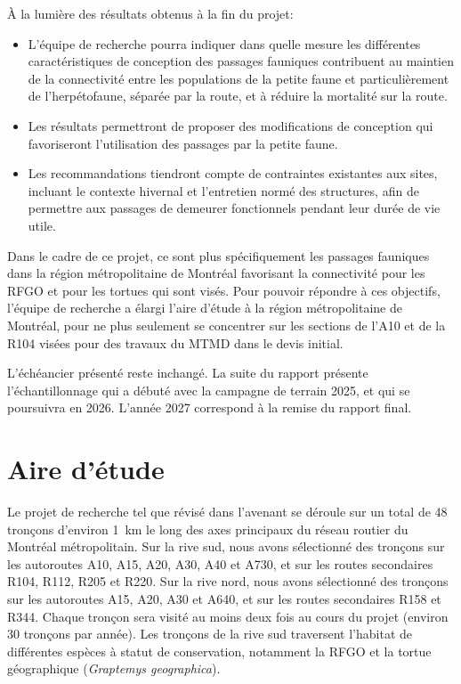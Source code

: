 À la lumière des résultats obtenus à la fin du projet:

\begin{itemize}
  \item L'équipe de recherche pourra indiquer dans quelle mesure les différentes
        caractéristiques de conception des passages fauniques contribuent au
        maintien de la connectivité entre les populations de la petite faune et
        particulièrement de l'herpétofaune, séparée par la route, et à réduire la
        mortalité sur la route.
  \item Les résultats permettront de proposer des modifications de conception qui
        favoriseront l'utilisation des passages par la petite faune.
  \item Les recommandations tiendront compte de contraintes existantes aux sites,
        incluant le contexte hivernal et l'entretien normé des structures, afin de
        permettre aux passages de demeurer fonctionnels pendant leur durée de vie
        utile.
\end{itemize}

Dans le cadre de ce projet, ce sont plus spécifiquement les passages fauniques dans
la région métropolitaine de Montréal favorisant la connectivité pour les RFGO et
pour les tortues qui sont visés. Pour pouvoir répondre à ces objectifs, l'équipe de
recherche a élargi l'aire d'étude à la région métropolitaine de Montréal, pour ne
plus seulement se concentrer sur les sections de l'A10 et de la R104 visées pour des
travaux du MTMD dans le devis initial.

L'échéancier présenté reste inchangé. La suite du rapport présente l'échantillonnage
qui a débuté avec la campagne de terrain 2025, et qui se poursuivra en 2026.
L'année 2027 correspond à la remise du rapport final.

\section{Aire d'étude}

Le projet de recherche tel que révisé dans l'avenant se déroule sur un total de 48
tronçons d'environ 1~km le long des axes principaux du réseau routier du Montréal
métropolitain. Sur la rive sud, nous avons sélectionné des tronçons sur les
autoroutes A10, A15, A20, A30, A40 et A730, et sur les routes secondaires R104,
R112, R205 et R220. Sur la rive nord, nous avons sélectionné des tronçons sur les
autoroutes A15, A20, A30 et A640, et sur les routes secondaires R158 et R344. Chaque
tronçon sera visité au moins deux fois au cours du projet (environ 30 tronçons par
année). Les tronçons de la rive sud traversent l'habitat de différentes espèces à
statut de conservation, notamment la RFGO et la tortue géographique
(\textit{Graptemys geographica}).


